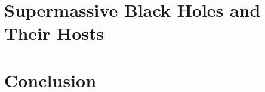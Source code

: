 \documentclass[12pt]{report}
\begin{document}
\chapter{Supermassive Black Holes and Their Hosts}
\label{chap:smbhs}







\chapter{Conclusion}
\label{chap:conclusion}




\singlespacing
%


\end{document}
